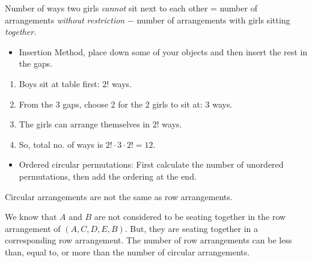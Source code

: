 \documentclass[oneside]{book}
\begin{document}
    \begin{example}{}{}
      Number of ways two girls \emph{cannot} sit next to each other = number of arrangements \emph{without restriction} \(-\) number of arrangements with girls sitting \emph{together}.
    \end{example}
\begin{stbox}{}
\begin{itemize}
    \item Insertion Method, place down some of your objects and then insert the rest in the gaps.
  \end{itemize}
\end{stbox}
    \begin{example}{}{}
      \begin{enumerate}[label={}]
        \item Boys sit at table first: \(2!\) ways.
        \item \vspace{-1mm} From the 3 gaps, choose 2 for the 2 girls to sit at: 3 ways.
        \item \vspace{-1mm} The girls can arrange themselves in \(2!\) ways.
        \item \vspace{-1mm} So, total no. of ways is \(2! \cdot 3 \cdot 2!=12\).
      \end{enumerate}
    \end{example}
\begin{stbox}{}
\begin{itemize}
    \item Ordered circular permutations: First calculate the number of unordered permutations, then add the ordering at the end.
  \end{itemize}
\end{stbox}
    \begin{note}
      Circular arrangements are not the same as row arrangements.
      
      We know that \(A\) and \(B\) are not considered to be seating together in the row arrangement of \((A,C,D,E,B)\). But, they are seating together in a corresponding row arrangement. The number of row arrangements can be less than, equal to, or more than the number of circular arrangements.
    \end{note}
\end{document}
